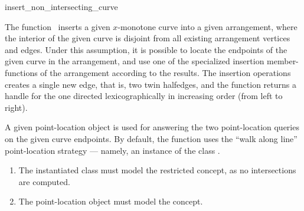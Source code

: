 \ccRefPageBegin

\begin{ccRefFunction}{insert_non_intersecting_curve}

\ccDefinition

The function \ccRefName\ inserts a given $x$-monotone curve into a given
arrangement, where the interior of the given curve is disjoint from all
existing arrangement vertices and edges. Under this assumption, it is
possible to locate the endpoints of the given curve in the arrangement,
and use one of the specialized insertion member-functions of the
arrangement according to the results. The insertion operations creates a
single new edge, that is, two twin halfedges, and the function returns a
handle for the one directed lexicographically in increasing order (from
left to right).

A given point-location object is used for answering the two point-location
queries on the given curve endpoints. By default, the function uses the
``walk along line'' point-location strategy --- namely, an instance of the
class .



\begin{enumerate}
\item The instantiated  class must model the restricted
 concept, as no intersections are computed.
\item The point-location object  must model the
 concept. 
\end{enumerate}

\end{ccRefFunction}

\ccRefPageEnd
